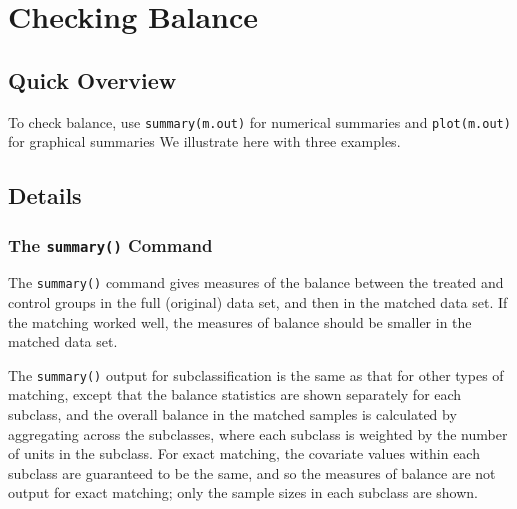 \section{Checking Balance}
\label{sec:balance}

\subsection{Quick Overview}

To check balance, use \texttt{summary(m.out)} for numerical summaries
and \texttt{plot(m.out)} for graphical summaries We illustrate here
with three examples.

\subsection{Details}

\subsubsection{The {\tt summary()} Command}

The \texttt{summary()} command gives measures of the balance between
the treated and control groups in the full (original) data set, and
then in the matched data set.  If the matching worked well, the
measures of balance should be smaller in the matched data set.

The \texttt{summary()} output for subclassification is the same as
that for other types of matching, except that the balance statistics
are shown separately for each subclass, and the overall balance in the
matched samples is calculated by aggregating across the subclasses,
where each subclass is weighted by the number of units in the
subclass.  For exact matching, the covariate values within each
subclass are guaranteed to be the same, and so the measures of balance
are not output for exact matching; only the sample sizes in each
subclass are shown.

